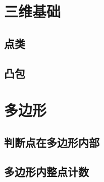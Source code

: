 \documentclass[openany, a4paper, 10pt]{book}
\begin{document}
\begin{spacing}{1.0}
		\section{三维基础}
			\subsection{点类}
				
			\subsection{凸包}
				
		\section{多边形}
			\subsection{判断点在多边形内部}
				
			\subsection{多边形内整点计数}
				

\end{spacing}
\end{document}
